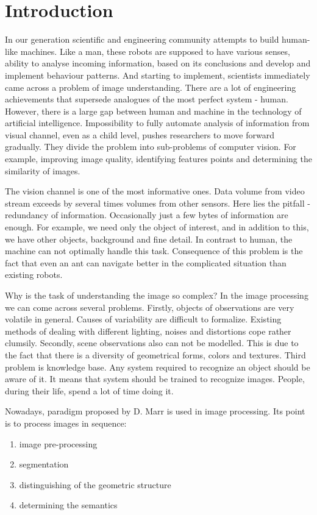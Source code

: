 \documentclass[12pt,a4paper,oneside,titlepage]{article}
\begin{document}
\section*{Introduction}
In our generation scientific and engineering community attempts to build human-like machines.
Like a man, these robots are supposed to have various senses, ability to analyse incoming information, based on its conclusions and develop and implement behaviour patterns.
And starting to implement, scientists immediately came across a problem of image understanding.
There are a lot of engineering achievements that supersede analogues of the most perfect system - human.
However, there is a large gap between human and machine in the technology of artificial intelligence.
Impossibility to fully automate analysis of information from visual channel, even as a child level, pushes researchers to move forward gradually.
They divide the problem into sub-problems of computer vision. 
For example, improving image quality, identifying features points and determining the similarity of images.

The vision channel is one of the most informative ones.
Data volume from video stream exceeds by several times volumes from other sensors.
Here lies the pitfall - redundancy of information.
Occasionally just a few bytes of information are enough.
For example, we need only the object of interest, and in addition to this, we have other objects, background and fine detail.
In contrast to human, the machine can not optimally handle this task.
Consequence of this problem is the fact that even an ant can navigate better in the complicated situation than existing robots.

Why is the task of understanding the image so complex?
In the image processing we can come across several problems.
Firstly, objects of observations are very volatile in general.
Causes of variability are difficult to formalize.
Existing methods of dealing with different lighting, noises and distortions cope rather clumsily.
Secondly, scene observations also can not be modelled.
This is due to the fact that there is a diversity of geometrical forms, colors and textures.
Third problem is knowledge base.
Any system required to recognize an object should be aware of it.
It means that system should be trained to recognize images.
People, during their life, spend a lot of time doing it.

Nowadays, paradigm proposed by D. Marr \cite{marr} is used in image processing.
Its point is to process images in sequence:
\begin{enumerate}
  \item image pre-processing
  \item segmentation
  \item distinguishing of the geometric structure
  \item determining the semantics
\end{enumerate}
\end{document}
